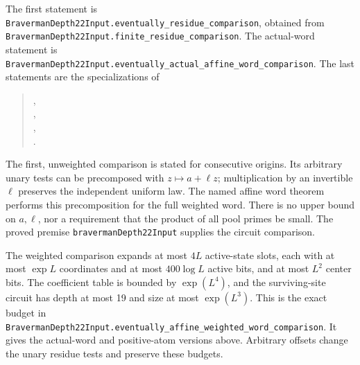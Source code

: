 \documentclass[11pt]{article}
\theoremstyle{definition}
\newcommand{\leanname}[1]{\nolinkurl{#1}}
\begin{document}
The first statement is
\leanname{BravermanDepth22Input.eventually_residue_comparison}, obtained
from \leanname{BravermanDepth22Input.finite_residue_comparison}.
The actual-word statement is
\leanname{BravermanDepth22Input.eventually_actual_affine_word_comparison}.
The last statements are the specializations of
\begin{quote}\small
{},\\
,\\
,\\
.
\end{quote}
The first, unweighted comparison is stated for consecutive origins.
Its arbitrary unary tests can be precomposed with
$z\mapsto a+\ell z$; multiplication by an invertible $\ell$ preserves
the independent uniform law. The named affine word theorem performs
this precomposition for the full weighted word.
There is no upper bound on $a,\ell$, nor a requirement that the product
of all pool primes be small. The proved premise
\leanname{bravermanDepth22Input} supplies the circuit comparison.

The weighted comparison expands at most $4L$ active-state slots, each
with at most $\exp L$ coordinates and at most $400\log L$ active bits,
and at most $L^2$ center bits. The coefficient table is bounded by
$\exp(L^4)$, and the surviving-site circuit has depth at most 19 and
size at most $\exp(L^3)$. This is the exact budget in
\leanname{BravermanDepth22Input.eventually_affine_weighted_word_comparison}.
It gives the actual-word and positive-atom versions above. Arbitrary
offsets change the unary residue tests and preserve these budgets.
\end{document}
